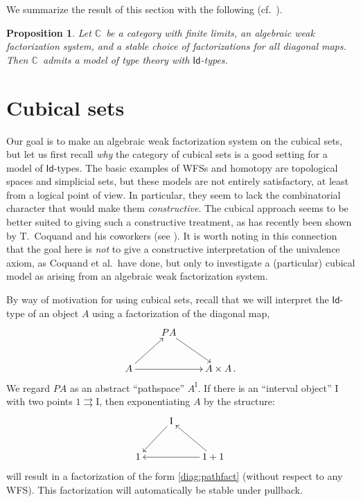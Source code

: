 \documentclass[12pt]{article}
\newcommand{\C}{\ensuremath{\mathbb{C}}}
\newcommand{\I}{\ensuremath{\mathrm{I}}}
\newcommand{\Id}{\ensuremath{\mathsf{Id}}}
\newtheorem{proposition}[theorem]{Proposition}
\theoremstyle{remark}
\theoremstyle{definition}
\begin{document}
We summarize the result of this section with the following (cf.~\cite{GvdB}).

\begin{proposition}
Let \C\ be a category with finite limits, an algebraic weak factorization system, and a stable choice of factorizations for all diagonal maps.  Then \C\ admits a model of type theory with \Id-types.
\end{proposition}

\section{Cubical sets}

Our goal is to make an algebraic weak factorization system on the cubical sets, but let us first recall \emph{why} the category of cubical sets is a good setting for a model of \Id-types.  The basic examples of WFSs and homotopy are topological spaces and simplicial sets, but these models are not entirely satisfactory, at least from a logical point of view.  In particular, they seem to lack the combinatorial character that would make them \emph{constructive}.  The cubical approach seems to be better suited to giving such a constructive treatment, as has recently been shown by T.~Coquand and his coworkers (see \cite{BCH}).  It is worth noting in this connection that the goal here is \emph{not} to give a constructive interpretation of the univalence axiom, as Coquand et al.\ have done, but only to investigate a (particular) cubical model as arising from an algebraic weak factorization system.

By way of motivation for using cubical sets, recall that we will interpret the \Id-type of an object $A$ using a factorization of the diagonal map,
\begin{equation}\label{diag:pathfact}
\xymatrix{
& PA \ar[rd] & \\
A \ar[rr] \ar[ru] && A\times A\,.
}
\end{equation}
We regard $PA$ as an abstract  ``pathspace'' $A^\I$.  If there is an ``interval object'' $\I$ with two points $1\rightrightarrows\I$, then exponentiating $A$ by the structure:
\[
\xymatrix{
& \ar[ld] \I  & \\
1 && \ar[ll] \ar[ul] 1+1\,
}
\]
will result in a factorization of the form \eqref{diag:pathfact} (without respect to any WFS).  This factorization will automatically be stable under pullback.
\end{document}
